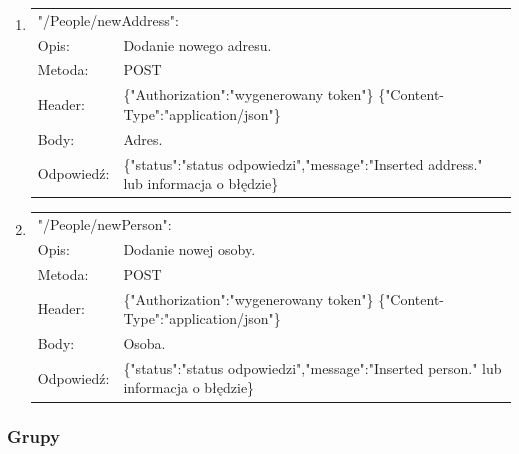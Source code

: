 \documentclass[12pt, titlepage]{article}
\begin{document}
\begin{enumerate}
	\item
	{\renewcommand{\arraystretch}{1.5}
	\begin{tabular}[t]{p{3cm} p{15cm}}
	\multicolumn{2}{l}{"/People/newAddress":} \\
	Opis: & Dodanie nowego adresu. \\
	Metoda: & POST \\
	Header: & \{"Authorization":"wygenerowany token"\} \newline \{"Content-Type":"application/json"\} \\
	Body: & Adres. \\
	Odpowiedź: & \{"status":"status odpowiedzi",\newline "message":"Inserted address." lub informacja o błędzie\} \\
	\end{tabular}}
	
	\item
	{\renewcommand{\arraystretch}{1.5}
	\begin{tabular}[t]{p{3cm} p{15cm}}
	\multicolumn{2}{l}{"/People/newPerson":} \\
	Opis: & Dodanie nowej osoby. \\
	Metoda: & POST \\
	Header: & \{"Authorization":"wygenerowany token"\} \newline \{"Content-Type":"application/json"\} \\
	Body: & Osoba. \\
	Odpowiedź: & \{"status":"status odpowiedzi",\newline "message":"Inserted person." lub informacja o błędzie\} \\
	\end{tabular}}
	
\end{enumerate}

\subsubsection{Grupy}
\end{document}
